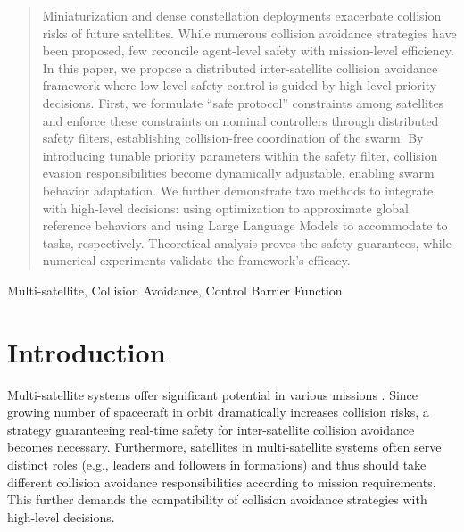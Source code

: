 \documentclass{ifacconf}
\begin{document}
\begin{frontmatter}
\begin{abstract}
   Miniaturization and dense constellation deployments exacerbate collision risks of future satellites. 
   While numerous collision avoidance strategies have been proposed, few reconcile agent-level safety with mission-level efficiency.
   In this paper, we propose a distributed inter-satellite collision avoidance framework where low-level safety control is guided by high-level priority decisions.
   First, we formulate ``safe protocol'' constraints among satellites and enforce these constraints on nominal controllers through distributed safety filters, establishing collision-free coordination of the swarm.
   By introducing tunable priority parameters within the safety filter, collision evasion responsibilities become dynamically adjustable, enabling swarm behavior adaptation. 
   We further demonstrate two methods to integrate with high-level decisions: using optimization to approximate global reference behaviors and using Large Language Models to accommodate to tasks, respectively.
   Theoretical analysis proves the safety guarantees, while numerical experiments validate the framework's efficacy.
\end{abstract}

\begin{keyword}
Multi-satellite, Collision Avoidance, Control Barrier Function
\end{keyword}

\end{frontmatter}

\section{Introduction}
\par Multi-satellite systems offer significant potential in various missions \cite[]{Bandyopadhyay2015SmallSatReview}.
Since growing number of spacecraft in orbit dramatically increases collision risks, a strategy guaranteeing real-time safety for inter-satellite collision avoidance becomes necessary. 
Furthermore, satellites in multi-satellite systems often serve distinct roles (e.g., leaders and followers in formations) and thus should take different collision avoidance responsibilities according to mission requirements.
This further demands the compatibility of collision avoidance strategies with high-level decisions.
\end{document}
